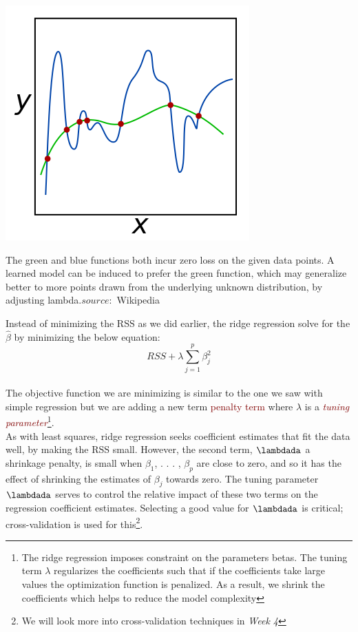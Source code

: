 \documentclass{tufte-handout}
\newcommand{\hlred}[1]{\textcolor{Maroon}{#1}}%
\begin{document}
\begin{marginfigure}%
  \includegraphics[width=\linewidth]{regulization.png}
  \caption{The green and blue functions both incur zero loss on the given data points. A learned model can be induced to prefer the green function, which may generalize better to more points drawn from the underlying unknown distribution, by adjusting lambda.$source:$ Wikipedia}
  \label{fig:marginfig}
\end{marginfigure}
Instead of minimizing the RSS as we did earlier, the ridge regression solve for the \(\hat{\beta}\) by minimizing the below equation:
\begin{equation}
    RSS + \lambda \sum_{j=1}^{p}\beta_j^2
   
\end{equation}
\\ The objective function we are minimizing is similar to the one we saw with simple regression but we are adding a new term \hlred{penalty term} where \(\lambda\) is a \emph{\hlred{tuning parameter}}\footnote{The ridge regression imposes constraint on the parameters betas. The tuning term \(\lambda\) regularizes the coefficients such that if the coefficients take large values the optimization function is penalized. As a result, we shrink the coefficients which helps to reduce the model complexity }.
\\As with least squares, ridge regression seeks coefficient estimates that fit the data well, by making the RSS small. However, the second term, \(\lambdada\) a shrinkage penalty, is small when \(\beta_1\), . . . , \(\beta_p \) are close to zero, and so it has the effect of shrinking the estimates of \(\beta_j \) towards zero. The tuning parameter \(\lambdada\) serves to control the relative impact of these two terms on the regression coefficient estimates. Selecting a good value for \(\lambdada\) is critical; cross-validation is used for this\footnote{We will look more into cross-validation techniques in \emph{Week 4} }.
\end{document}
